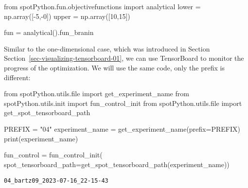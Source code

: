 \documentclass[
  letterpaper,
  DIV=11,
  numbers=noendperiod]{scrreprt}
\newenvironment{Shaded}{\begin{snugshade}}{\end{snugshade}}
\newcommand{\BuiltInTok}[1]{\textcolor[rgb]{0.00,0.23,0.31}{#1}}
\newcommand{\DecValTok}[1]{\textcolor[rgb]{0.68,0.00,0.00}{#1}}
\newcommand{\ImportTok}[1]{\textcolor[rgb]{0.00,0.46,0.62}{#1}}
\newcommand{\NormalTok}[1]{\textcolor[rgb]{0.00,0.23,0.31}{#1}}
\newcommand{\OperatorTok}[1]{\textcolor[rgb]{0.37,0.37,0.37}{#1}}
\newcommand{\StringTok}[1]{\textcolor[rgb]{0.13,0.47,0.30}{#1}}
\begin{document}
\begin{Shaded}
\begin{Highlighting}[]
\ImportTok{from}\NormalTok{ spotPython.fun.objectivefunctions }\ImportTok{import}\NormalTok{ analytical}
\NormalTok{lower }\OperatorTok{=}\NormalTok{ np.array([}\OperatorTok{{-}}\DecValTok{5}\NormalTok{,}\OperatorTok{{-}}\DecValTok{0}\NormalTok{])}
\NormalTok{upper }\OperatorTok{=}\NormalTok{ np.array([}\DecValTok{10}\NormalTok{,}\DecValTok{15}\NormalTok{])}
\end{Highlighting}
\end{Shaded}

\begin{Shaded}
\begin{Highlighting}[]
\NormalTok{fun }\OperatorTok{=}\NormalTok{ analytical().fun\_branin}
\end{Highlighting}
\end{Shaded}

\begin{tcolorbox}[enhanced jigsaw, left=2mm, title=\textcolor{quarto-callout-note-color}{\faInfo}\hspace{0.5em}{TensorBoard}, titlerule=0mm, toprule=.15mm, leftrule=.75mm, colbacktitle=quarto-callout-note-color!10!white, colback=white, arc=.35mm, toptitle=1mm, bottomtitle=1mm, colframe=quarto-callout-note-color-frame, bottomrule=.15mm, rightrule=.15mm, breakable, coltitle=black, opacitybacktitle=0.6, opacityback=0]

Similar to the one-dimensional case, which was introduced in Section
Section~\ref{sec-visualizing-tensorboard-01}, we can use TensorBoard to
monitor the progress of the optimization. We will use the same code,
only the prefix is different:

\begin{Shaded}
\begin{Highlighting}[]
\ImportTok{from}\NormalTok{ spotPython.utils.}\BuiltInTok{file} \ImportTok{import}\NormalTok{ get\_experiment\_name}
\ImportTok{from}\NormalTok{ spotPython.utils.init }\ImportTok{import}\NormalTok{ fun\_control\_init}
\ImportTok{from}\NormalTok{ spotPython.utils.}\BuiltInTok{file} \ImportTok{import}\NormalTok{ get\_spot\_tensorboard\_path}

\NormalTok{PREFIX }\OperatorTok{=} \StringTok{"04"}
\NormalTok{experiment\_name }\OperatorTok{=}\NormalTok{ get\_experiment\_name(prefix}\OperatorTok{=}\NormalTok{PREFIX)}
\BuiltInTok{print}\NormalTok{(experiment\_name)}

\NormalTok{fun\_control }\OperatorTok{=}\NormalTok{ fun\_control\_init(}
\NormalTok{    spot\_tensorboard\_path}\OperatorTok{=}\NormalTok{get\_spot\_tensorboard\_path(experiment\_name))}
\end{Highlighting}
\end{Shaded}

\begin{verbatim}
04_bartz09_2023-07-16_22-15-43
\end{verbatim}

\end{tcolorbox}
\end{document}
